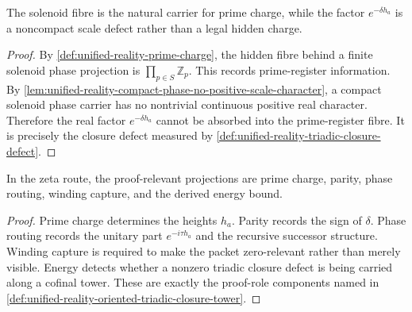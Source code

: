\begin{corollary}
\label{cor:unified-reality-solenoid-fibres-carry-charge-not-real-scale}
The solenoid fibre is the natural carrier for prime charge, while the
factor $e^{-\delta h_a}$ is a noncompact scale defect rather than a
legal hidden charge.
\end{corollary}

\begin{proof}
By
\autoref{def:unified-reality-prime-charge}, the hidden fibre behind a
finite solenoid phase projection is $\prod_{p\in S}\mathbb Z_p$.  This
records prime-register information.  By
\autoref{lem:unified-reality-compact-phase-no-positive-scale-character},
a compact solenoid phase carrier has no nontrivial continuous positive
real character.  Therefore the real factor $e^{-\delta h_a}$ cannot be
absorbed into the prime-register fibre.  It is precisely the closure
defect measured by
\autoref{def:unified-reality-triadic-closure-defect}.
\end{proof}

\begin{corollary}
\label{cor:unified-reality-rh-use-projection-dictionary}
In the zeta route, the proof-relevant projections are prime charge,
parity, phase routing, winding capture, and the derived energy bound.
\end{corollary}

\begin{proof}
Prime charge determines the heights $h_a$.  Parity records the sign of
$\delta$.  Phase routing records the unitary part
$e^{-i\tau h_a}$ and the recursive successor structure.  Winding capture
is required to make the packet zero-relevant rather than merely visible.
Energy detects whether a nonzero triadic closure defect is being carried
along a cofinal tower.  These are exactly the proof-role components
named in
\autoref{def:unified-reality-oriented-triadic-closure-tower}.
\end{proof}

